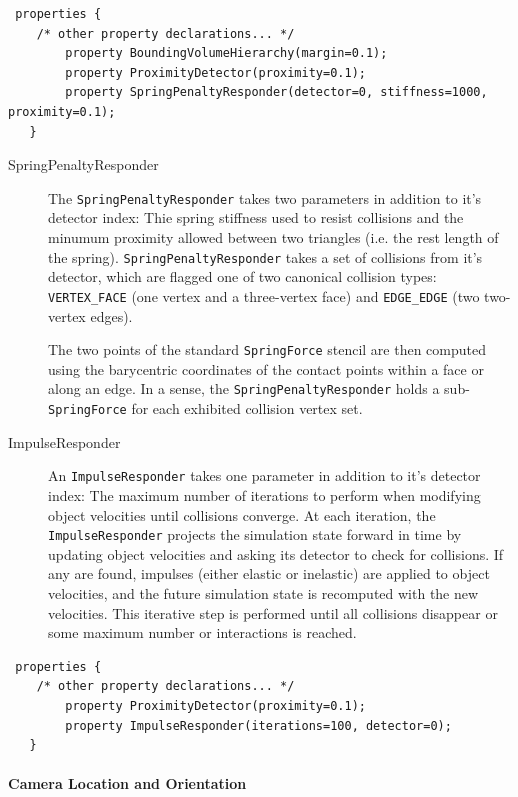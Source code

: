\begin{verbatim}
 properties { 
	/* other property declarations... */
        property BoundingVolumeHierarchy(margin=0.1);
        property ProximityDetector(proximity=0.1);
        property SpringPenaltyResponder(detector=0, stiffness=1000, proximity=0.1);
   }
\end{verbatim}
\begin{description}
\item[SpringPenaltyResponder] The \texttt{SpringPenaltyResponder}
  takes two parameters in addition to it's detector index: Thie spring
  stiffness used to resist collisions and the minumum proximity
  allowed between two triangles (i.e. the rest length of the
  spring). \texttt{SpringPenaltyResponder} takes a set of collisions
  from it's detector, which are flagged one of two canonical collision
  types: \texttt{VERTEX\_FACE} (one vertex and a three-vertex face)
  and \texttt{EDGE\_EDGE} (two two-vertex edges).

  The two points of the standard \texttt{SpringForce} stencil are then
  computed using the barycentric coordinates of the contact points
  within a face or along an edge. In a sense, the
  \texttt{SpringPenaltyResponder} holds a sub-\texttt{SpringForce} for
  each exhibited collision vertex set.

\item[ImpulseResponder] An \texttt{ImpulseResponder} takes one
  parameter in addition to it's detector index: The maximum number of
  iterations to perform when modifying object velocities until
  collisions converge. At each iteration, the
  \texttt{ImpulseResponder} projects the simulation state forward in
  time by updating object velocities and asking its detector to check
  for collisions. If any are found, impulses (either elastic or
  inelastic) are applied to object velocities, and the future
  simulation state is recomputed with the new velocities. This
  iterative step is performed until all collisions disappear or some
  maximum number or interactions is reached.
\end{description}
\begin{verbatim}
 properties { 
	/* other property declarations... */
        property ProximityDetector(proximity=0.1);
        property ImpulseResponder(iterations=100, detector=0);
   }
\end{verbatim}


\paragraph{Camera Location and Orientation}

